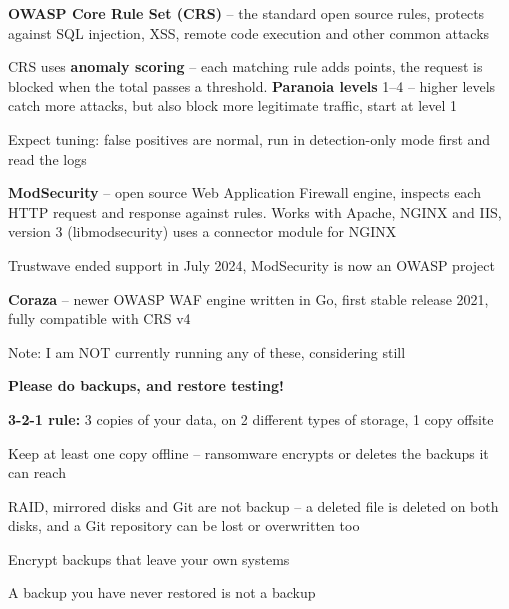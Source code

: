 \documentclass[Screen16to9,17pt]{foils}
\begin{document}

\begin{list2}
\item {\bf OWASP Core Rule Set (CRS)} -- the standard open source rules, protects against SQL injection, XSS, remote code execution and other common attacks 
\item CRS uses {\bf anomaly scoring} -- each matching rule adds points, the request is blocked when the total passes a threshold. {\bf Paranoia levels} 1--4 -- higher levels catch more attacks, but also block more legitimate traffic, start at level 1
\item Expect tuning: false positives are normal, run in detection-only mode first and read the logs
\item {\bf ModSecurity} -- open source Web Application Firewall engine, inspects each HTTP request and response against rules. Works with Apache, NGINX and IIS, version 3 (libmodsecurity) uses a connector module for NGINX
\item Trustwave ended support in July 2024, ModSecurity is now an OWASP project\\
\item {\bf Coraza} -- newer OWASP WAF engine written in Go, first stable release 2021, fully compatible with CRS v4\\

\end{list2}

Note: I am NOT currently running any of these, considering still

\breakdance



\vskip 1cm
\centerline{\LARGE \bf Please do backups, and restore testing!}

\begin{list2}
\item {\bf 3-2-1 rule:} 3 copies of your data, on 2 different types of storage, 1 copy offsite\\
\item Keep at least one copy offline -- ransomware encrypts or deletes the backups it can reach
\item RAID, mirrored disks and Git are not backup -- a deleted file is deleted on both disks, and a Git repository can be lost or overwritten too
\item Encrypt backups that leave your own systems
\item A backup you have never restored is not a backup
\end{list2}
\end{document}
